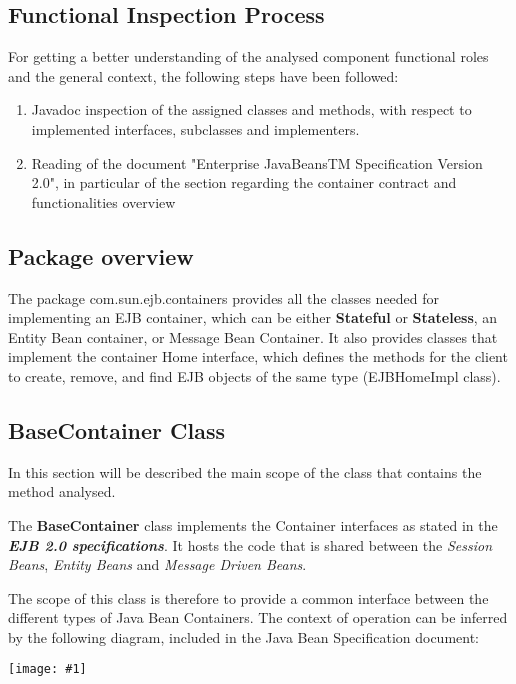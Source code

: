 \documentclass[11pt, a4paper,titlepage]{article}
\newcommand{\image}[1]{
	\begin{center}
		\noindent \texttt{[image: \#1]}
	\end{center}
	}
\begin{document}
	\subsection{Functional Inspection Process}
	For getting a better understanding of the analysed component functional roles and the general context, the following steps have been followed:
	\begin{enumerate}
		\item Javadoc inspection of the assigned classes and methods, with respect to implemented interfaces, subclasses and implementers.
		\item Reading of the document "Enterprise JavaBeansTM Specification Version 2.0", in particular of the section regarding the container contract and functionalities overview 
	\end{enumerate}
	\subsection{Package overview}
	The package com.sun.ejb.containers provides all the classes needed for implementing an EJB container, which can be either \textbf{Stateful} or \textbf{Stateless}, an Entity Bean container, or Message Bean Container. \newline
	It also provides classes that implement the container Home interface, which defines the methods for the client to create, remove, and find EJB objects of the same type (EJBHomeImpl class).
	
	\subsection{BaseContainer Class}
	In this section will be described the main scope of the class that contains the method analysed. 
	 
	The \textbf{BaseContainer} class implements the Container interfaces as stated in the \textit{\textbf{EJB 2.0 specifications}}. It hosts the code that is shared between the \textit{Session Beans}, \textit{Entity Beans} and \textit{Message Driven Beans}. \newline
	
	The scope of this class is therefore to provide a common interface between the different types of Java Bean Containers. The context of operation can be inferred by the following diagram, included in the Java Bean Specification document:
	 \image{ejb_contract.png}
\end{document}
